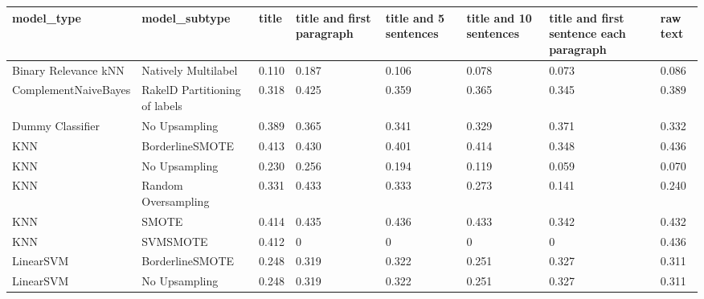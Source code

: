 \begin{tabular}{llllllll}
\toprule
                     model\_type &                 model\_subtype & title & title and first paragraph & title and 5 sentences & title and 10 sentences & title and first sentence each paragraph &  raw text \\
\midrule
           Binary Relevance kNN &           Natively Multilabel & 0.110 &                     0.187 &                 0.106 &                  0.078 &                                   0.073 &     0.086 \\
           ComplementNaiveBayes & RakelD Partitioning of labels & 0.318 &                     0.425 &                 0.359 &                  0.365 &                                   0.345 &     0.389 \\
               Dummy Classifier &                 No Upsampling & 0.389 &                     0.365 &                 0.341 &                  0.329 &                                   0.371 &     0.332 \\
                            KNN &               BorderlineSMOTE & 0.413 &                     0.430 &                 0.401 &                  0.414 &                                   0.348 &     0.436 \\
                            KNN &                 No Upsampling & 0.230 &                     0.256 &                 0.194 &                  0.119 &                                   0.059 &     0.070 \\
                            KNN &           Random Oversampling & 0.331 &                     0.433 &                 0.333 &                  0.273 &                                   0.141 &     0.240 \\
                            KNN &                         SMOTE & 0.414 &                     0.435 &                 0.436 &                  0.433 &                                   0.342 &     0.432 \\
                            KNN &                      SVMSMOTE & 0.412 &                         0 &                     0 &                      0 &                                       0 &     0.436 \\
                      LinearSVM &               BorderlineSMOTE & 0.248 &                     0.319 &                 0.322 &                  0.251 &                                   0.327 &     0.311 \\
                      LinearSVM &                 No Upsampling & 0.248 &                     0.319 &                 0.322 &                  0.251 &                                   0.327 &     0.311 \\

\end{tabular}
